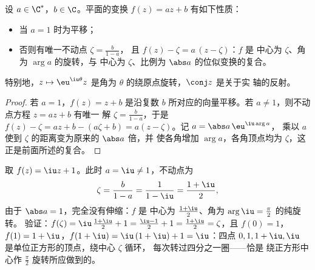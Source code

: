 \begin{proposition}[映射 $z \mapsto az + b$]\label{prop:b1:complex:similitude}
设 $a \in \C^*$，$b \in \C$。平面的变换 $f(z) = az + b$
有如下性质：
\begin{itemize}
  \item 当 $a = 1$ 时为平移；
  \item 否则有唯一不动点 $\zeta = \frac{b}{1-a}$，
        且 $f(z) - \zeta = a\,(z - \zeta)$：$f$ 是
        中心为 $\zeta$、角为 $\arg a$ 的旋转，与
        中心为 $\zeta$、比例为 $\abs a$ 的位似变换的复合。
\end{itemize}
特别地，$z \mapsto \eu^{\iu\theta} z$ 是角为
$\theta$ 的绕原点旋转，$\conj z$ 是关于实
轴的反射。
\end{proposition}

\begin{proof}
若 $a = 1$，$f(z) = z + b$ 是沿复数 $b$ 所对应的向量平移。若
$a \neq 1$，则不动点方程 $z = az + b$ 有唯一
解 $\zeta = \frac{b}{1-a}$，于是 $f(z) - \zeta = az + b -
(a\zeta + b) = a(z - \zeta)$。记 $a = \abs a\, \eu^{\iu\arg a}$，
乘以 $a$ 使到 $\zeta$ 的距离变为原来的 $\abs a$ 倍，并
使各角增加 $\arg a$，各角顶点均为 $\zeta$，这正是前面所述的复合。
\end{proof}

\begin{example}\label{ex:b1:complex:classify}
取 $f(z) = \iu z + 1$。此时 $a = \iu \neq 1$，不动点为
\[
\zeta = \frac{b}{1 - a} = \frac1{1 - \iu}
= \frac{1 + \iu}{2},
\]
由于 $\abs a = 1$，完全没有伸缩：$f$ 是
中心为 $\frac{1+\iu}2$、角为 $\arg \iu = \frac\pi2$ 的纯旋转。
验证：$f(\zeta) = \iu\,\frac{1+\iu}2 + 1 = \frac{\iu - 1}2 + 1 =
\frac{1 + \iu}2 = \zeta$，且 $f(0) = 1$，$f(1) = 1 + \iu$，$f(1 +
\iu) = \iu\,(1 + \iu) + 1 = \iu$：四点 $0, 1, 1+\iu, \iu$
是单位正方形的顶点，绕中心 $\zeta$ 循环，
每次转过四分之一圈——恰是
绕正方形中心作 $\frac\pi2$ 旋转所应做到的。
\end{example}

